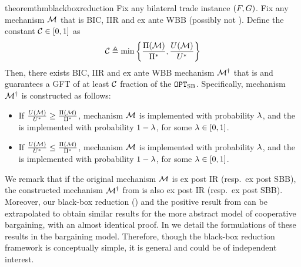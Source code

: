 \begin{restatable}{theorem}{thmblackboxreduction}
    \label{thm:blackbox reduction}
    {Fix any bilateral trade instance $(F,G)$.}
    Fix any mechanism $\mathcal{M}$ {that is BIC, IIR and ex ante WBB} (possibly not {\ksfair}). 
    Define the constant $\mathcal{C}\in[0,1]$ as
    \begin{align*}
        \mathcal{C} \triangleq \min\left\{
        \frac{\Pi(\mathcal{M})}{\Pi^*},
        \frac{U(\mathcal{M})}{U^*}
        \right\}
    \end{align*}
    Then, there exists BIC, IIR and ex ante WBB mechanism $\mathcal{M}^\dagger$ that is {\ksfair} and guarantees a GFT of at least $\mathcal{C}$ fraction of the {\SecondBest} $\texttt{OPT}_{\textsc{SB}}$. Specifically, mechanism $\mathcal{M}^\dagger$ is constructed as follows:
    \begin{itemize}
        \item If $\frac{U(\mathcal{M})}{U^*} \geq \frac{\Pi(\mathcal{M})}{\Pi^*}$, mechanism $\mathcal{M}$ is implemented with probability $\lambda$, and the {\SellerOffer} is implemented with probability $1-\lambda$, for some  $\lambda\in[0, 1]$.
        \item If $\frac{U(\mathcal{M})}{U^*} \leq \frac{\Pi(\mathcal{M})}{\Pi^*}$, mechanism $\mathcal{M}$ is implemented with probability $\lambda$, and the {\BuyerOffer} is implemented with probability $1-\lambda$, for some  $\lambda\in[0, 1]$.
    \end{itemize}
\end{restatable}
We remark that if the original mechanism $\mathcal{M}$ is ex post IR (resp.\ ex post SBB), the constructed mechanism $\mathcal{M}^\dagger$ from  is also ex post IR (resp.\ ex post SBB). Moreover, our black-box reduction () and the positive result from  can be extrapolated to obtain similar results for the more abstract model of cooperative bargaining, with an almost identical proof. In  we detail the formulations of these results in the bargaining model. Therefore, though the black-box reduction framework is conceptually simple, it is general and could be of independent interest. 
